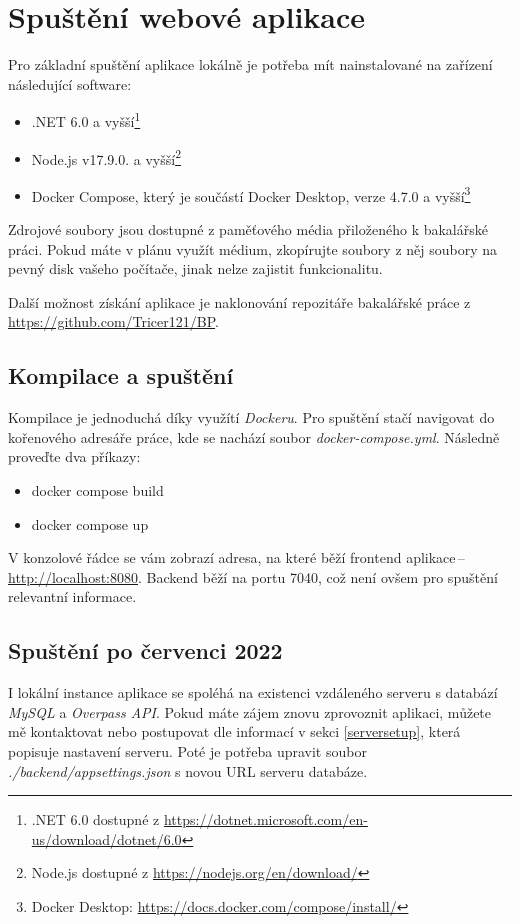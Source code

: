 \appendix
\chapter{Spuštění webové aplikace}
\label{startapp}
Pro základní spuštění aplikace lokálně je potřeba mít nainstalované na zařízení následující software:
\begin{itemize}
    \item .NET 6.0 a vyšší\footnote{.NET 6.0 dostupné z \url{https://dotnet.microsoft.com/en-us/download/dotnet/6.0}}
    \item Node.js v17.9.0. a vyšší\footnote{Node.js dostupné z \url{https://nodejs.org/en/download/}}
    \item Docker Compose, který je součástí Docker Desktop, verze 4.7.0 a vyšší\footnote{Docker Desktop: \url{https://docs.docker.com/compose/install/}}
\end{itemize}

Zdrojové soubory jsou dostupné z paměťového média přiloženého k bakalářské práci. Pokud máte v plánu využít médium, zkopírujte soubory z něj soubory na pevný disk vašeho počítače, jinak nelze zajistit funkcionalitu. 

Další možnost získání aplikace je naklonování repozitáře bakalářské práce z \url{https://github.com/Tricer121/BP}. 

\section{Kompilace a spuštění}
Kompilace je jednoduchá díky využítí \emph{Dockeru}. 
Pro spuštění stačí navigovat do kořenového adresáře práce, kde se nachází soubor \emph{docker-compose.yml}. Následně proveďte dva příkazy:
\begin{itemize}
    \item docker compose build
    \item docker compose up
\end{itemize}

V konzolové řádce se vám zobrazí adresa, na které běží frontend aplikace\,--\,\url{http://localhost:8080}. Backend běží na portu 7040, což není ovšem pro spuštění relevantní informace.

\section{Spuštění po červenci 2022}
I lokální instance aplikace se spoléhá na existenci vzdáleného serveru s databází \emph{MySQL} a \emph{Overpass API}. Pokud máte zájem znovu zprovoznit aplikaci, můžete mě kontaktovat nebo postupovat dle informací v sekci \ref{serversetup}, která popisuje nastavení serveru. Poté je potřeba upravit soubor \emph{./backend/appsettings.json} s novou URL serveru databáze.
